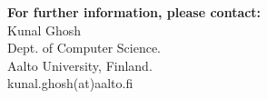 \documentclass[a4paper]{article}
\begin{document}



 



\noindent \textbf{For further information, please contact:}\\

\noindent Kunal Ghosh\\
Dept. of Computer Science.\\
Aalto University, Finland.\\
kunal.ghosh(at)aalto.fi\\
\end{document}
